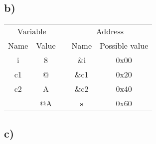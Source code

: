 \documentclass[a4paper,11pt]{report}
\begin{document}
\subsection*{b)}

\begin{table}[h]
  \centering
  \begin{tabular}{ccccc}
    \multicolumn{2}{c}{Variable}                      &  & \multicolumn{2}{c}{Address} \\
    Name                    & Value                   &  & Name       & Possible value \\ \cline{2-2}
    \multicolumn{1}{c|}{i}  & \multicolumn{1}{c|}{8}  &  & \&i  & 0x00           \\ \cline{2-2}
    \multicolumn{1}{c|}{c1} & \multicolumn{1}{c|}{@}  &  & \&c1 & 0x20           \\ \cline{2-2}
    \multicolumn{1}{c|}{c2} & \multicolumn{1}{c|}{A}  &  & \&c2 & 0x40           \\ \cline{2-2}
    \multicolumn{1}{c|}{}   & \multicolumn{1}{c|}{@A} &  & s   & 0x60           \\ \cline{2-2}
  \end{tabular}
\end{table}

\subsection*{c)}
\end{document}
